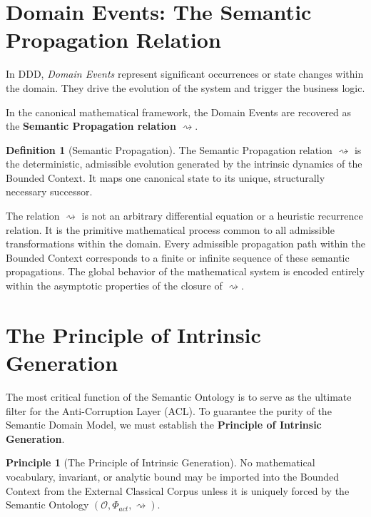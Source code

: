 \documentclass[12pt,openany]{extbook}
\theoremstyle{plain}
\theoremstyle{definition}
\newtheorem{definition}{Definition}[chapter]
\newtheorem{principle}{Principle}[chapter]
\begin{document}
\section{Domain Events: The Semantic Propagation Relation}

In DDD, \emph{Domain Events} represent significant occurrences or state changes within the domain. They drive the evolution of the system and trigger the business logic.

In the canonical mathematical framework, the Domain Events are recovered as the \textbf{Semantic Propagation relation} $\rightsquigarrow$.

\begin{definition}[Semantic Propagation]
The Semantic Propagation relation $\rightsquigarrow$ is the deterministic, admissible evolution generated by the intrinsic dynamics of the Bounded Context. It maps one canonical state to its unique, structurally necessary successor.
\end{definition}

The relation $\rightsquigarrow$ is not an arbitrary differential equation or a heuristic recurrence relation. It is the primitive mathematical process common to all admissible transformations within the domain. Every admissible propagation path within the Bounded Context corresponds to a finite or infinite sequence of these semantic propagations. The global behavior of the mathematical system is encoded entirely within the asymptotic properties of the closure of $\rightsquigarrow$.

\section{The Principle of Intrinsic Generation}

The most critical function of the Semantic Ontology is to serve as the ultimate filter for the Anti-Corruption Layer (ACL). To guarantee the purity of the Semantic Domain Model, we must establish the \textbf{Principle of Intrinsic Generation}.

\begin{principle}[The Principle of Intrinsic Generation]
No mathematical vocabulary, invariant, or analytic bound may be imported into the Bounded Context from the External Classical Corpus unless it is uniquely forced by the Semantic Ontology $(\mathcal{O}, \Phi_{act}, \rightsquigarrow)$.
\end{principle}
\end{document}
